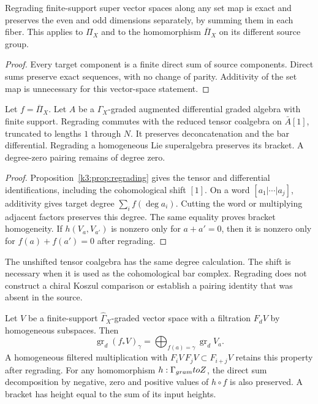 \begin{proposition}
\label{prop:finite-fibre-pushforward-exact}
\label{prop:finite-parity-pushforward}
Regrading finite-support super vector spaces along any set map is
exact and preserves the even and odd dimensions separately, by
summing them in each fiber.  This applies to $\Pi_X$ and to the
homomorphism $\overline\Pi_X$ on its different source group.
\end{proposition}

\begin{proof}
Every target component is a finite direct sum of source components.
Direct sums preserve exact sequences, with no change of parity.
Additivity of the set map is unnecessary for this vector-space
statement.
\end{proof}

\begin{proposition}
\label{prop:finite-bar-pushforward-commutes}
\label{prop:finite-bracket-pairing-pushforward}
Let $f=\overline\Pi_X$.  Let $A$ be a $\widehat\Gamma_X$-graded augmented differential
graded algebra with finite support.  Regrading commutes with the
reduced tensor coalgebra on $\bar A[1]$, truncated to lengths
$1$ through $N$.  It preserves deconcatenation and the bar
differential.  Regrading a homogeneous Lie superalgebra preserves
its bracket.  A degree-zero pairing remains of degree zero.
\end{proposition}

\begin{proof}
Proposition~\ref{k3:prop:regrading} gives the tensor and differential
identifications, including the cohomological shift $[1]$.
On a word $[a_1|\cdots|a_j]$, additivity gives target degree
$\sum_i f(\deg a_i)$.  Cutting the word or multiplying adjacent
factors preserves this degree.  The same equality proves bracket
homogeneity.  If $h(V_a,V_{a'})$ is nonzero only for $a+a'=0$,
then it is nonzero only for $f(a)+f(a')=0$ after regrading.
\end{proof}

The unshifted tensor coalgebra has the same degree calculation.
The shift is necessary when it is used as the cohomological bar
complex.  Regrading does not construct a chiral Koszul comparison
or establish a pairing identity that was absent in the source.

\begin{proposition}
\label{prop:finite-pbw-pushforward}
\label{prop:finite-triangular-pushforward}
Let $V$ be a finite-support $\widehat\Gamma_X$-graded vector space
with a filtration $F_dV$ by homogeneous subspaces.  Then
\[
\operatorname{gr}_d(f_*V)_\gamma
=\bigoplus_{f(a)=\gamma}\operatorname{gr}_dV_a.
\]
A homogeneous filtered multiplication with
$F_iV\,F_jV\subset F_{i+j}V$ retains this property after regrading.
For any homomorphism $h:\Gamma_{gram}toZ$, the direct
sum decomposition by negative, zero and positive values of $h\circ f$
is also preserved.  A bracket has height equal to the sum of its
input heights.
\end{proposition}

